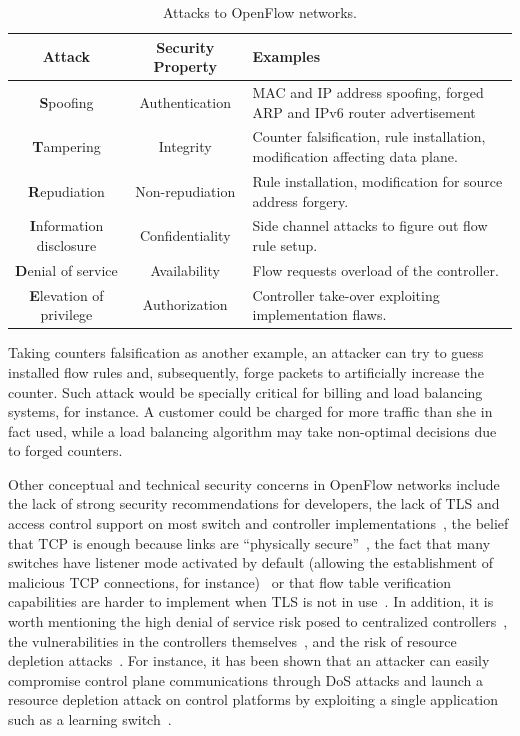 {\renewcommand{\arraystretch}{1.4}
\begin{table}[!htp]
\caption{Attacks to OpenFlow networks.}
\label{tab:securitythreatsopenflow}
\begin{center}
\footnotesize
\begin{tabularx}{.85\textwidth}{ccX}
\hline
\textbf{Attack}  & \textbf{Security Property} & \textbf{Examples} \\\hline
\textbf{S}poofing & Authentication & MAC and IP address spoofing, forged ARP and IPv6 router advertisement\\\hline
\textbf{T}ampering & Integrity & Counter falsification, rule installation, modification affecting data plane.\\\hline
\textbf{R}epudiation & Non-repudiation & Rule installation, modification for source address forgery.\\\hline
\textbf{I}nformation disclosure & Confidentiality & Side channel attacks to figure out flow rule setup. \\\hline
\textbf{D}enial of service & Availability &  Flow requests overload of the controller. \\\hline
\textbf{E}levation of privilege & Authorization & Controller take-over exploiting implementation flaws. \\\hline
\end{tabularx}
\end{center}
\end{table}
}

Taking counters falsification as another example, an attacker can try to guess installed flow 
rules and, subsequently, forge packets to artificially increase the counter.
Such attack would be specially critical for billing and load balancing systems, for instance.
A customer could be charged for more traffic than she in fact used, while a load balancing algorithm may take non-optimal decisions due to forged counters. 

Other conceptual and technical security concerns in OpenFlow networks include the lack of strong 
security recommendations for developers, the lack of TLS and access control support on most switch and controller 
implementations~\cite{wasserman2013}, the belief that TCP is enough because links are ``physically secure''~\cite{benton2013,wasserman2013}, the fact that many switches have listener 
mode activated by default (allowing the establishment of malicious TCP connections, for instance)~\cite{benton2013} or that flow table verification capabilities are harder to implement when TLS is not 
in use~\cite{wasserman2013,son2013}.
In addition, it is worth mentioning the high denial of service risk posed to centralized controllers~\cite{shin2013,son2013}, the vulnerabilities in the controllers themselves~\cite{son2013,kreutz2013}, and the risk of resource 
depletion attacks~\cite{shin2013,benton2013}.
For instance, it has been shown that an attacker can easily compromise control plane communications through 
DoS attacks and launch a resource depletion attack on control platforms by exploiting a single  application such as a learning switch~\cite{benton2013,shin2013}.


